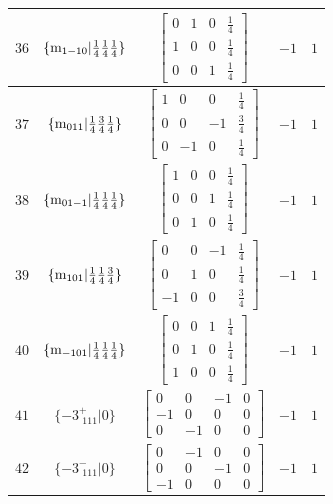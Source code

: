 \documentclass[fleqn,8pt]{jsarticle}
\begin{document}
\begin{longtable}{ccccc}
$ 36 $ & $ \{{\rm m}_{1-10}|\frac{1}{4} \frac{1}{4} \frac{1}{4}\} $ & $ \begin{bmatrix} 0 & 1 & 0 & \frac{1}{4} \\ 1 & 0 & 0 & \frac{1}{4} \\ 0 & 0 & 1 & \frac{1}{4} \end{bmatrix} $ & $ -1 $ & $ 1 $ \\ \hline
$ 37 $ & $ \{{\rm m}_{011}|\frac{1}{4} \frac{3}{4} \frac{1}{4}\} $ & $ \begin{bmatrix} 1 & 0 & 0 & \frac{1}{4} \\ 0 & 0 & -1 & \frac{3}{4} \\ 0 & -1 & 0 & \frac{1}{4} \end{bmatrix} $ & $ -1 $ & $ 1 $ \\ \hline
$ 38 $ & $ \{{\rm m}_{01-1}|\frac{1}{4} \frac{1}{4} \frac{1}{4}\} $ & $ \begin{bmatrix} 1 & 0 & 0 & \frac{1}{4} \\ 0 & 0 & 1 & \frac{1}{4} \\ 0 & 1 & 0 & \frac{1}{4} \end{bmatrix} $ & $ -1 $ & $ 1 $ \\ \hline
$ 39 $ & $ \{{\rm m}_{101}|\frac{1}{4} \frac{1}{4} \frac{3}{4}\} $ & $ \begin{bmatrix} 0 & 0 & -1 & \frac{1}{4} \\ 0 & 1 & 0 & \frac{1}{4} \\ -1 & 0 & 0 & \frac{3}{4} \end{bmatrix} $ & $ -1 $ & $ 1 $ \\ \hline
$ 40 $ & $ \{{\rm m}_{-101}|\frac{1}{4} \frac{1}{4} \frac{1}{4}\} $ & $ \begin{bmatrix} 0 & 0 & 1 & \frac{1}{4} \\ 0 & 1 & 0 & \frac{1}{4} \\ 1 & 0 & 0 & \frac{1}{4} \end{bmatrix} $ & $ -1 $ & $ 1 $ \\ \hline
$ 41 $ & $ \{-3^{+}_{\,\,111}|0\} $ & $ \begin{bmatrix} 0 & 0 & -1 & 0 \\ -1 & 0 & 0 & 0 \\ 0 & -1 & 0 & 0 \end{bmatrix} $ & $ -1 $ & $ 1 $ \\ \hline
$ 42 $ & $ \{-3^{-}_{\,\,111}|0\} $ & $ \begin{bmatrix} 0 & -1 & 0 & 0 \\ 0 & 0 & -1 & 0 \\ -1 & 0 & 0 & 0 \end{bmatrix} $ & $ -1 $ & $ 1 $ \\ \hline

\end{longtable}
\end{document}
